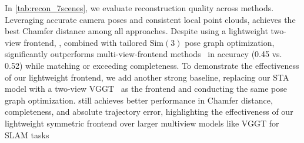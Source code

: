 In \cref{tab:recon_7scenes}, we evaluate reconstruction quality across methods. Leveraging accurate camera poses and consistent local point clouds, \ours achieves the best Chamfer distance among all approaches. Despite using a lightweight two-view frontend, \ours, combined with tailored $\mathrm{Sim}(3)$ pose graph optimization, significantly outperforms multi-view-frontend methods~\cite{liu2025slam3r,maggio2025vggtslam} in accuracy (0.45 vs. 0.52) while matching or exceeding completeness.
To demonstrate the effectiveness of our lightweight frontend, we add another strong baseline, replacing our STA model with a two-view VGGT~\cite{wang2025vggt} as the frontend and conducting the same pose graph optimization. \ours still achieves better performance in Chamfer distance, completeness, and absolute trajectory error, highlighting the effectiveness of our lightweight symmetric frontend over larger multiview models like VGGT for SLAM tasks



